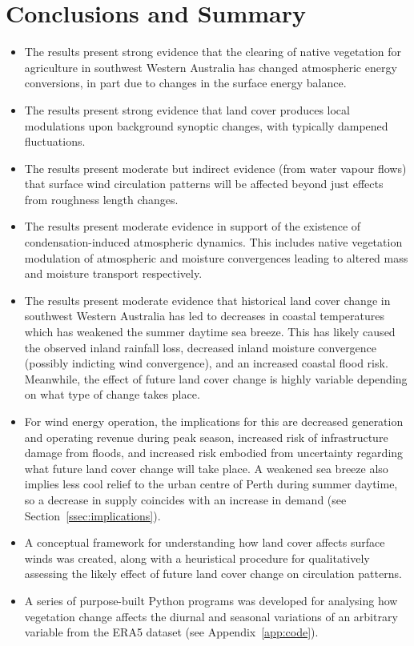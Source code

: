 \chapter{Conclusions and Summary}
\label{ch:conclusions}

\begin{itemize}
	\item The results present strong evidence that the clearing of native vegetation for agriculture in southwest Western Australia has changed atmospheric energy conversions, in part due to changes in the surface energy balance.
	\item The results present strong evidence that land cover produces local modulations upon background synoptic changes, with typically dampened fluctuations.
	\item The results present moderate but indirect evidence (from water vapour flows) that surface wind circulation patterns will be affected beyond just effects from roughness length changes.
	\item The results present moderate evidence in support of the existence of condensation-induced atmospheric dynamics. This includes native vegetation modulation of atmospheric and moisture convergences leading to altered mass and moisture transport respectively.
	\item The results present moderate evidence that historical land cover change in southwest Western Australia has led to decreases in coastal temperatures which has weakened the summer daytime sea breeze. This has likely caused the observed inland rainfall loss, decreased inland moisture convergence (possibly indicting wind convergence), and an increased coastal flood risk. Meanwhile, the effect of future land cover change is highly variable depending on what type of change takes place.
	\item For wind energy operation, the implications for this are decreased generation and operating revenue during peak season, increased risk of infrastructure damage from floods, and increased risk embodied from uncertainty regarding what future land cover change will take place. A weakened sea breeze also implies less cool relief to the urban centre of Perth during summer daytime, so a decrease in supply coincides with an increase in demand (see Section~\ref{ssec:implications}).
	\item A conceptual framework for understanding how land cover affects surface winds was created, along with a heuristical procedure for qualitatively assessing the likely effect of future land cover change on circulation patterns.
	\item A series of purpose-built Python programs was developed for analysing how vegetation change affects the diurnal and seasonal variations of an arbitrary variable from the \ac{ERA5} dataset (see Appendix~\ref{app:code}).
\end{itemize}

